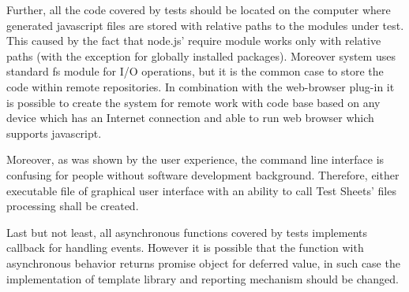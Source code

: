 Further, all the code covered by tests should be located on the computer where generated javascript files are stored with relative paths to the modules under test. This caused by the fact that node.js' require module works only with relative paths (with the exception for globally installed packages). Moreover system uses standard fs module for I/O operations, but it is the common case to store the code within remote repositories. In combination with the web-browser plug-in it is possible to create the system for remote work with code base based on any device which has an Internet connection and able to run web browser which supports javascript.

Moreover, as was shown by the user experience, the command line interface is confusing for people without software development background. Therefore, either executable file of graphical user interface with an ability to call Test Sheets' files processing shall be created.

Last but not least, all asynchronous functions covered by tests implements callback for handling events. However it is possible that the function with asynchronous behavior returns promise object for deferred value, in such case the implementation of template library and reporting mechanism should be changed.

%




